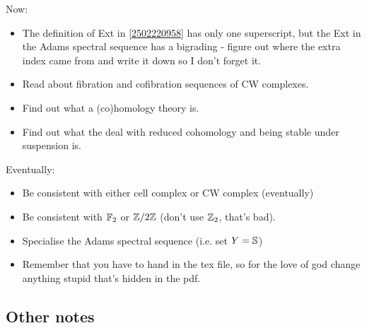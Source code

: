 \documentclass{MetricNotes2023}
\def\bb{\ensuremath\mathbb}
\def\inte{\ensuremath\mathbb{Z}}
\begin{document}
Now:

\begin{itemize}
\item The definition of Ext in \ref{2502220958} has only one superscript, but the Ext in the Adams spectral sequence has a bigrading - figure out where the extra index came from and write it down so I don't forget it.
\item Read about fibration and cofibration sequences of CW complexes. 
\item Find out what a (co)homology theory is. 
\item Find out what the deal with reduced cohomology and being stable under suspension is.
\end{itemize}

Eventually:

\begin{itemize}
\item Be consistent with either cell complex or CW complex (eventually)
\item Be consistent with \(\bb{F}_2\)  or \(\inte/2\inte\) (don't use \(\inte_2\), that's bad).
\item Specialise the Adams spectral sequence (i.e. set \(Y=\bb{S}\))
\item Remember that you have to hand in the tex file, so for the love of god change anything stupid that's hidden in the pdf.
\end{itemize}

\subsection{Other notes}
\end{document}
